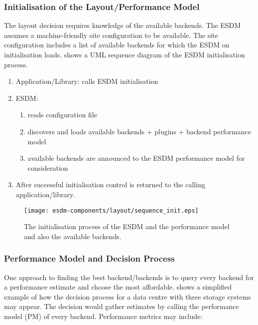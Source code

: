\subsubsection{Initialisation of the Layout/Performance Model}
\label{sec:layout/logical/init}

The layout decision requires knowledge of the available backends.
The ESDM assumes a machine-friendly site configuration to be available.
The site configuration includes a list of available backends for which the ESDM on initialisation loads.
 shows a UML sequence diagram of the ESDM initialisation process.

\begin{enumerate}
	\item Application/Library: calls ESDM initialisation
	\item ESDM:
	\begin{enumerate}
		\item reads configuration file
		\item discovers and loads available backends + plugins + backend performance model
		\item available backends are announced to the ESDM performance model for consideration
	\end{enumerate}
	\item After successful initialisation control is returned to the calling application/library.
\end{enumerate}

\begin{figure}
	\centering
	\texttt{[image: esdm-components/layout/sequence\_init.eps]}
	\caption{The initialisation process of the ESDM and the performance model and also the available backends.}
	\label{fig:esdm layout initialisation}
\end{figure}



\subsubsection{Performance Model and Decision Process}
\label{sec: layout/logical/decision}

One approach to finding the best backend/backends is to query every backend for a performance estimate and choose the most affordable.
 shows a simplified example of how the decision process for a data centre with three storage systems may appear.
The decision would gather estimates by calling the performance model (PM) of every backend.
Performance metrics may include:

